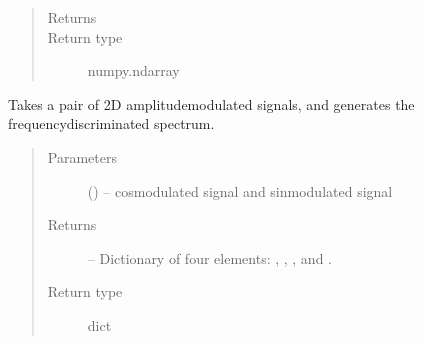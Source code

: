 \documentclass[letterpaper,10pt,english]{sphinxmanual}
\begin{document}
\begin{fulllineitems}
\begin{quote}
\begin{description}
\begin{itemize}
\end{itemize}

\item[{Returns}] \leavevmode
\sphinxAtStartPar
{}

\item[{Return type}] \leavevmode
\sphinxAtStartPar
numpy.ndarray

\end{description}\end{quote}

\end{fulllineitems}


\begin{fulllineitems}
\label{\detokenize{references/sig:nmrespy.sig.proc_amp_modulated}}
\sphinxAtStartPar
Takes a pair of 2D amplitude\sphinxhyphen{}modulated signals, and generates the
frequency\sphinxhyphen{}discriminated spectrum.
\begin{quote}\begin{description}
\item[{Parameters}] \leavevmode
\sphinxAtStartPar
{} (\sphinxstyleliteralemphasis{\sphinxupquote{{[}}}\sphinxstyleliteralemphasis{\sphinxupquote{, }}\sphinxstyleliteralemphasis{\sphinxupquote{{]}}}) – cos\sphinxhyphen{}modulated signal and sin\sphinxhyphen{}modulated signal

\item[{Returns}] \leavevmode
\sphinxAtStartPar
{} – Dictionary of four elements: , , , and .

\item[{Return type}] \leavevmode
\sphinxAtStartPar
dict

\end{description}\end{quote}

\end{fulllineitems}

\end{document}
